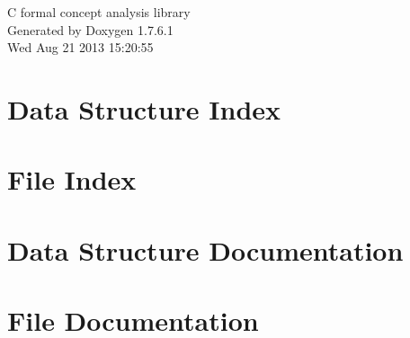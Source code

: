 \documentclass[a4paper]{book}
\begin{document}
\hypersetup{pageanchor=false,citecolor=blue}
\begin{titlepage}
\vspace*{7cm}
\begin{center}
{\Large \-C formal concept analysis library }\\
\vspace*{1cm}
{\large \-Generated by Doxygen 1.7.6.1}\\
\vspace*{0.5cm}
{\small Wed Aug 21 2013 15:20:55}\\
\end{center}
\end{titlepage}
\clearemptydoublepage
{}
\tableofcontents
\clearemptydoublepage
{}
\hypersetup{pageanchor=true,citecolor=blue}
\chapter{\-Data \-Structure \-Index}

\chapter{\-File \-Index}

\chapter{\-Data \-Structure \-Documentation}









\chapter{\-File \-Documentation}
















\printindex
\end{document}
